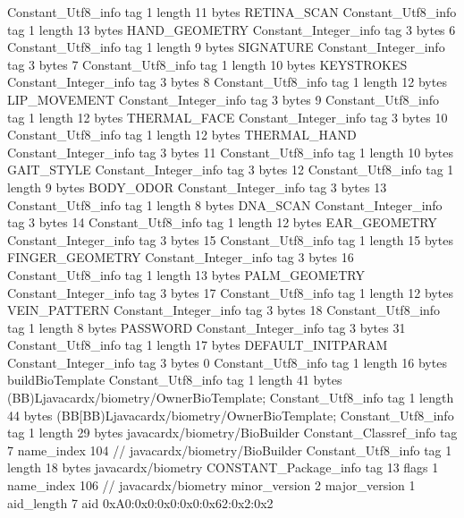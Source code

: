 {{{		}
		Constant_Utf8_info {
			tag	1
			length	11
			bytes	RETINA_SCAN
		}
		Constant_Utf8_info {
			tag	1
			length	13
			bytes	HAND_GEOMETRY
		}
		Constant_Integer_info {
			tag	3
			bytes	6
		}
		Constant_Utf8_info {
			tag	1
			length	9
			bytes	SIGNATURE
		}
		Constant_Integer_info {
			tag	3
			bytes	7
		}
		Constant_Utf8_info {
			tag	1
			length	10
			bytes	KEYSTROKES
		}
		Constant_Integer_info {
			tag	3
			bytes	8
		}
		Constant_Utf8_info {
			tag	1
			length	12
			bytes	LIP_MOVEMENT
		}
		Constant_Integer_info {
			tag	3
			bytes	9
		}
		Constant_Utf8_info {
			tag	1
			length	12
			bytes	THERMAL_FACE
		}
		Constant_Integer_info {
			tag	3
			bytes	10
		}
		Constant_Utf8_info {
			tag	1
			length	12
			bytes	THERMAL_HAND
		}
		Constant_Integer_info {
			tag	3
			bytes	11
		}
		Constant_Utf8_info {
			tag	1
			length	10
			bytes	GAIT_STYLE
		}
		Constant_Integer_info {
			tag	3
			bytes	12
		}
		Constant_Utf8_info {
			tag	1
			length	9
			bytes	BODY_ODOR
		}
		Constant_Integer_info {
			tag	3
			bytes	13
		}
		Constant_Utf8_info {
			tag	1
			length	8
			bytes	DNA_SCAN
		}
		Constant_Integer_info {
			tag	3
			bytes	14
		}
		Constant_Utf8_info {
			tag	1
			length	12
			bytes	EAR_GEOMETRY
		}
		Constant_Integer_info {
			tag	3
			bytes	15
		}
		Constant_Utf8_info {
			tag	1
			length	15
			bytes	FINGER_GEOMETRY
		}
		Constant_Integer_info {
			tag	3
			bytes	16
		}
		Constant_Utf8_info {
			tag	1
			length	13
			bytes	PALM_GEOMETRY
		}
		Constant_Integer_info {
			tag	3
			bytes	17
		}
		Constant_Utf8_info {
			tag	1
			length	12
			bytes	VEIN_PATTERN
		}
		Constant_Integer_info {
			tag	3
			bytes	18
		}
		Constant_Utf8_info {
			tag	1
			length	8
			bytes	PASSWORD
		}
		Constant_Integer_info {
			tag	3
			bytes	31
		}
		Constant_Utf8_info {
			tag	1
			length	17
			bytes	DEFAULT_INITPARAM
		}
		Constant_Integer_info {
			tag	3
			bytes	0
		}
		Constant_Utf8_info {
			tag	1
			length	16
			bytes	buildBioTemplate
		}
		Constant_Utf8_info {
			tag	1
			length	41
			bytes	(BB)Ljavacardx/biometry/OwnerBioTemplate;
		}
		Constant_Utf8_info {
			tag	1
			length	44
			bytes	(BB[BB)Ljavacardx/biometry/OwnerBioTemplate;
		}
		Constant_Utf8_info {
			tag	1
			length	29
			bytes	javacardx/biometry/BioBuilder
		}
		Constant_Classref_info {
			tag	7
			name_index	104		// javacardx/biometry/BioBuilder
		}
		Constant_Utf8_info {
			tag	1
			length	18
			bytes	javacardx/biometry
		}
		CONSTANT_Package_info {
			tag	13
			flags	1
			name_index	106		// javacardx/biometry
			minor_version	2
			major_version	1
			aid_length	7
			aid	0xA0:0x0:0x0:0x0:0x62:0x2:0x2
}}}
